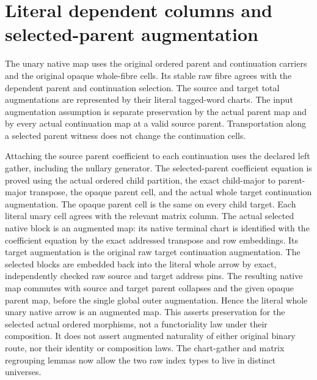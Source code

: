 \documentclass{article}
\begin{document}
\section*{Literal dependent columns and selected-parent augmentation}
The unary native map uses the original ordered parent and continuation
carriers and the original opaque whole-fibre cells. Its stable raw
fibre agrees with the dependent parent and continuation selection.
The source and target total augmentations are represented by their
literal tagged-word charts. The input augmentation assumption is
separate preservation by the actual parent map and by every actual
continuation map at a valid source parent. Transportation along
a selected parent witness does not change the continuation cells.

Attaching the source parent coefficient to each continuation uses
the declared left gather, including the nullary generator. The
selected-parent coefficient equation is proved using the actual
ordered child partition, the exact child-major to parent-major
transpose, the opaque parent cell, and the actual whole target
continuation augmentation. The opaque parent cell is the same on
every child target. Each literal unary cell agrees with the relevant
matrix column. The actual selected native block is an augmented map:
its native terminal chart is identified with the coefficient equation
by the exact addressed transpose and row embeddings. Its target
augmentation is the original raw target continuation augmentation.
The selected blocks are embedded back into the literal whole arrow
by exact, independently checked raw source and target address pins.
The resulting native map commutes with source and target parent
collapses and the given opaque parent map, before the single global
outer augmentation. Hence the literal whole unary native arrow is
an augmented map. This asserts preservation for the selected actual
ordered morphisms, not a functoriality law under their composition. It does not assert augmented naturality of either
original binary route, nor their identity or composition laws.
The chart-gather and matrix regrouping lemmas now allow the two raw
index types to live in distinct universes.
\end{document}
